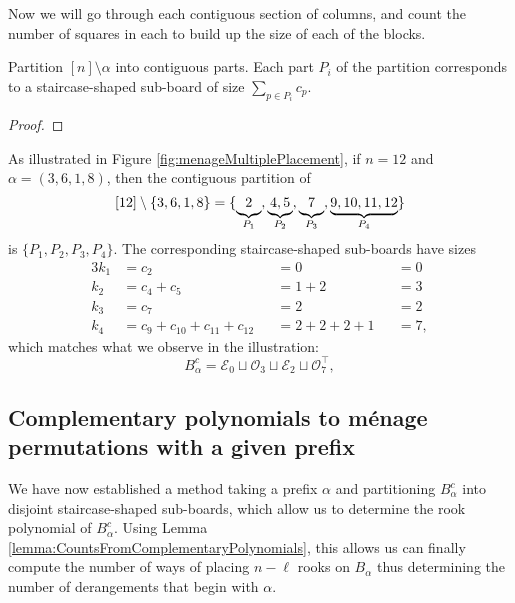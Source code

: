 Now we will go through each contiguous section of columns, and count the number
of squares in each to build up the size of each of the blocks.

\begin{lemma}
  Partition $[n] \setminus \alpha$ into contiguous parts. Each part $P_i$
  of the partition corresponds to a staircase-shaped sub-board of size
  $\sum_{p \in P_i} c_p$.
\end{lemma}

\begin{proof}
\end{proof}

\begin{example}
  As illustrated in Figure \ref{fig:menageMultiplePlacement}, if $n = 12$
  and $\alpha = (3,6,1,8)$, then the contiguous partition of \[
    [12] \setminus \{3,6,1,8\} = \{
      \underbrace{2\vphantom{,}}_{P_1},
      \underbrace{4, 5}_{P_2},
      \underbrace{7\vphantom{,}}_{P_3},
      \underbrace{9, 10, 11, 12}_{P_4}
    \}
  \] is $\{P_1, P_2, P_3, P_4\}$. The corresponding staircase-shaped sub-boards
  have sizes
  \begin{alignat*}{3}
    k_1 &= c_2                            &&= 0             &&= 0 \\
    k_2 &= c_4 + c_5                      &&= 1 + 2         &&= 3 \\
    k_3 &= c_7                            &&= 2             &&= 2 \\
    k_4 &= c_9 + c_{10} + c_{11} + c_{12} &&= 2 + 2 + 2 + 1 &&= 7,
  \end{alignat*}
  which matches what we observe in the illustration:
  \[
    B_\alpha^c = \mathcal{E}_0 \sqcup \mathcal{O}_3 \sqcup \mathcal{E}_2 \sqcup \mathcal{O}_7^\intercal,
  \]
  \label{ex:blocksFromPrefix}
\end{example}

\subsection{Complementary polynomials to m\'enage permutations with a given prefix}
We have now established a method taking a prefix $\alpha$
and partitioning $B_\alpha^c$ into disjoint staircase-shaped sub-boards,
which allow us to determine the rook polynomial of $B_\alpha^c$.
Using Lemma \ref{lemma:CountsFromComplementaryPolynomials}, this allows us
can finally compute the number of ways of placing $n - \ell$ rooks on
$B_\alpha$ thus determining the number of derangements that begin with
$\alpha$.

